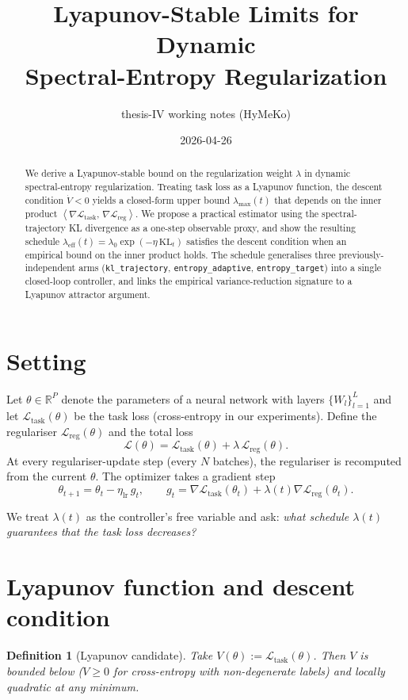 \documentclass[11pt,a4paper]{article}
\title{Lyapunov-Stable Limits for Dynamic\\
       Spectral-Entropy Regularization}
\author{thesis-IV working notes (HyMeKo)}
\date{2026-04-26}
\newtheorem{definition}{Definition}
\newcommand{\inner}[2]{\left\langle #1,\, #2 \right\rangle}
\newcommand{\Wlist}{\{W_l\}_{l=1}^{L}}
\newcommand{\Ltask}{\mathcal{L}_{\text{task}}}
\newcommand{\Lreg}{\mathcal{L}_{\text{reg}}}
\begin{document}
\maketitle

\begin{abstract}
We derive a Lyapunov-stable bound on the regularization weight
$\lambda$ in dynamic spectral-entropy regularization. Treating task
loss as a Lyapunov function, the descent condition
$\dot V < 0$ yields a closed-form upper bound
$\lambda_{\max}(t)$ that depends on the inner product
$\inner{\nabla\Ltask}{\nabla \Lreg}$. We propose a practical
estimator using the spectral-trajectory KL divergence as a one-step
observable proxy, and show the resulting schedule
$\lambda_{\text{eff}}(t) = \lambda_0 \exp(-\eta\,\mathrm{KL}_t)$
satisfies the descent condition when an empirical bound on the inner
product holds. The schedule generalises three previously-independent
arms (\texttt{kl\_trajectory}, \texttt{entropy\_adaptive},
\texttt{entropy\_target}) into a single closed-loop controller, and
links the empirical variance-reduction signature to a Lyapunov
attractor argument.
\end{abstract}

\section{Setting}

Let $\theta \in \mathbb{R}^P$ denote the parameters of a neural network
with layers $\Wlist$ and let $\Ltask(\theta)$ be the task loss
(cross-entropy in our experiments). Define the regulariser
$\Lreg(\theta)$ and the total loss
\[
\mathcal{L}(\theta) = \Ltask(\theta) + \lambda\, \Lreg(\theta).
\]
At every regulariser-update step (every $N$ batches), the regulariser
is recomputed from the current $\theta$. The optimizer takes a
gradient step
\[
\theta_{t+1} = \theta_t - \eta_{\text{lr}}\, g_t,
\qquad g_t = \nabla \Ltask(\theta_t) + \lambda(t) \nabla \Lreg(\theta_t).
\]

We treat $\lambda(t)$ as the controller's free variable and ask:
\emph{what schedule $\lambda(t)$ guarantees that the task loss
decreases?}

\section{Lyapunov function and descent condition}

\begin{definition}[Lyapunov candidate]
Take $V(\theta) := \Ltask(\theta)$. Then $V$ is bounded below
($V \geq 0$ for cross-entropy with non-degenerate labels) and locally
quadratic at any minimum.
\end{definition}
\end{document}
